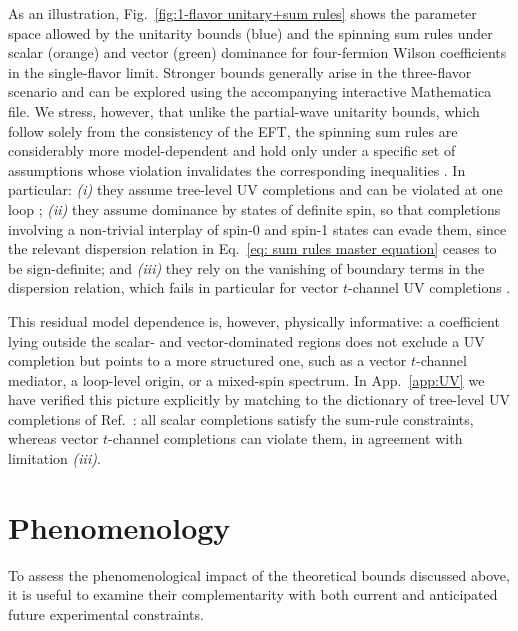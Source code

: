 \documentclass[
aps,
prd,
10pt,
twocolumn,
oneside,
preprintnumbers,
superscriptaddress,
amsmath,
amssymb,
nofootinbib,
flushbottom]{revtex4-2}
\begin{document}
As an illustration, Fig.~\ref{fig:1-flavor unitary+sum rules} shows the parameter space allowed by the unitarity bounds (blue) and the spinning sum rules under scalar (orange) and vector (green) dominance for four-fermion Wilson coefficients in the single-flavor limit. 
Stronger bounds generally arise in the three-flavor scenario and can be explored using the accompanying interactive Mathematica file.
We stress, however, that unlike the partial-wave unitarity bounds, which follow
solely from the consistency of the EFT, the spinning sum rules are considerably
more model-dependent and hold only under a specific set of assumptions whose
violation invalidates the corresponding inequalities
\cite{Remmen:2020uze,Remmen:2022orj,Azatov:2021ygj,Gu:2020thj}. In particular:
\textit{(i)} they assume tree-level UV completions and can be violated at one loop
\cite{Azatov:2021ygj}; \textit{(ii)} they assume dominance by states of
definite spin, so that completions involving a non-trivial interplay of spin-0 and
spin-1 states can evade them, since the relevant dispersion relation in
Eq.~\eqref{eq: sum rules master equation} ceases to be sign-definite; and
\textit{(iii)} they rely on the vanishing of boundary terms in the dispersion
relation, which fails in particular for vector $t$-channel UV completions
\cite{Remmen:2020uze,Remmen:2022orj,Azatov:2021ygj}.

This residual model dependence is, however, physically informative: a coefficient lying outside the scalar- and vector-dominated regions does not exclude a UV
completion but points to a more structured one, such as a vector $t$-channel mediator, 
a loop-level origin, or a mixed-spin spectrum. In App.~\ref{app:UV} we have verified this picture explicitly by matching to the dictionary of tree-level UV completions of Ref.~\cite{deBlas:2017xtg}: all scalar completions satisfy the sum-rule constraints, whereas vector $t$-channel completions can violate them, in agreement with limitation \textit{(iii)}.

\section{Phenomenology\label{sec:pheno}}

To assess the phenomenological impact of the theoretical bounds discussed above, it is useful to examine their complementarity with both current and anticipated future experimental constraints.
\end{document}
